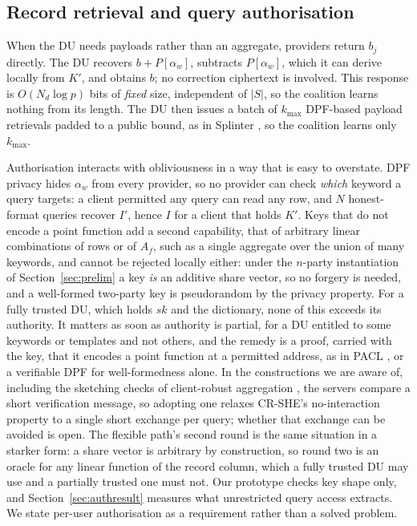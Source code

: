 \documentclass[a4paper,fleqn]{cas-sc}
\begin{document}
\subsection{Record retrieval and query authorisation}
\label{sec:auth}
When the DU needs payloads rather than an aggregate, providers return $b_j$
directly. The DU recovers $b+P[\alpha_w]$, subtracts $P[\alpha_w]$, which it
can derive locally from $K'$, and obtains $b$; no correction ciphertext is
involved. This response is $O(N_d\log p)$ bits of \emph{fixed} size,
independent of $|S|$, so the coalition learns nothing from its length. The DU
then issues a batch of $k_{\max}$ DPF-based payload retrievals padded to a
public bound, as in Splinter \citep{splinter}, so the coalition learns only
$k_{\max}$.

Authorisation interacts with obliviousness in a way that is easy to overstate.
DPF privacy hides $\alpha_w$ from every provider, so no provider can check
\emph{which} keyword a query targets: a client permitted any query can read
any row, and $N$ honest-format queries recover $I'$, hence $I$ for a client
that holds $K'$. Keys that do not encode a point function add a second
capability, that of arbitrary linear combinations of rows or of $A_f$, such as
a single aggregate over the union of many keywords, and cannot be rejected
locally either: under the $n$-party instantiation of Section~\ref{sec:prelim}
a key \emph{is} an additive share vector, so no forgery is needed, and a
well-formed two-party key is pseudorandom by the privacy property. For a fully
trusted DU, which holds $sk$ and the dictionary, none of this exceeds its
authority. It matters as soon as authority is partial, for a DU entitled to
some keywords or templates and not others, and the remedy is a proof, carried
with the key, that it encodes a point function at a permitted address, as in
PACL \citep{pacl}, or a verifiable DPF \citep{decastro2022lightweight} for
well-formedness alone. In the constructions we are aware of, including the
sketching checks of client-robust aggregation \citep{boneh2021lightweight},
the servers compare a short verification message, so adopting one relaxes
CR-SHE's no-interaction property to a single short exchange per query; whether
that exchange can be avoided is open. The flexible path's second round is
the same situation in a starker form: a share vector is arbitrary by
construction, so round two is an oracle for any linear function of the record
column, which a fully trusted DU may use and a partially trusted one must not.
Our prototype checks key shape only, and Section~\ref{sec:authresult}
measures what unrestricted query access extracts. We state per-user
authorisation as a requirement rather than a solved problem.
\end{document}
